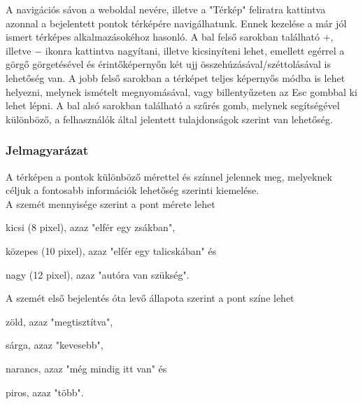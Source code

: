 A navigációs sávon a weboldal nevére, illetve a "Térkép" feliratra kattintva azonnal a bejelentett pontok térképére navigálhatunk. Ennek kezelése a már jól ismert térképes alkalmazásokéhoz hasonló. A bal felső sarokban található \hspace{0.1cm}\boldmath\(+\)\hspace{0.1cm}, illetve \hspace{0.1cm}\boldmath\(-\)\hspace{0.1cm} ikonra kattintva nagyítani, illetve kicsinyíteni lehet, emellett egérrel a görgő görgetésével és érintőképernyőn két ujj összehúzásával/széttolásával is lehetőség van. A jobb felső sarokban a térképet teljes képernyős módba is lehet helyezni, melynek ismételt megnyomásával, vagy billentyűzeten az Esc gombbal ki lehet lépni. A bal alsó sarokban található a szűrés gomb, melynek segítségével különböző, a felhasználók által jelentett tulajdonságok szerint van lehetőség.

\subsubsection{Jelmagyarázat}

A térképen a pontok különböző mérettel és színnel jelennek meg, melyeknek céljuk a fontosabb információk lehetőség szerinti kiemelése.\\
A szemét mennyisége szerint a pont mérete lehet
\begin{compactitem}
	\item[\large\textbullet] kicsi (8 pixel), azaz "elfér egy zsákban",
	\item[\Large\textbullet] közepes (10 pixel), azaz "elfér egy talicskában" és
	\item[\LARGE\textbullet] nagy (12 pixel), azaz "autóra van szükség".
\end{compactitem}\newpage
A szemét első bejelentés óta levő állapota szerint a pont színe lehet
\begin{compactitem}
	\item[\textcolor{tt_green}{\Large\textbullet}] zöld, azaz "megtisztítva",
	\item[\textcolor{tt_yellow}{\Large\textbullet}] sárga, azaz "kevesebb",
	\item[\textcolor{tt_orange}{\Large\textbullet}] narancs, azaz "még mindig itt van" és
	\item[\textcolor{tt_red}{\Large\textbullet}] piros, azaz "több".
\end{compactitem}

